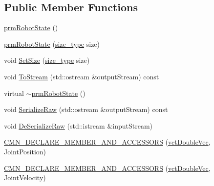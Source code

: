\subsection*{Public Member Functions}
\begin{DoxyCompactItemize}
\item 
\hyperlink{classprm_robot_state_a4c688de0cb879c541ac8a8aab59715fe}{prm\-Robot\-State} ()
\item 
\hyperlink{classprm_robot_state_a08475253ccadaab8c01f04fd113e20a7}{prm\-Robot\-State} (\hyperlink{classprm_robot_state_a2cf2c739d5b3cdd3f9d44e2878183d90}{size\-\_\-type} size)
\item 
void \hyperlink{classprm_robot_state_a2d4ea78a7658becc5e57988eaf4cacd2}{Set\-Size} (\hyperlink{classprm_robot_state_a2cf2c739d5b3cdd3f9d44e2878183d90}{size\-\_\-type} size)
\item 
void \hyperlink{classprm_robot_state_a52834514857c906ed8f11a71f7e11123}{To\-Stream} (std\-::ostream \&output\-Stream) const 
\item 
virtual \hyperlink{classprm_robot_state_aa14bb8c0d12806e4db28408ea0f89e1a}{$\sim$prm\-Robot\-State} ()
\item 
void \hyperlink{classprm_robot_state_a19f7827d565843680215b6e544b183dd}{Serialize\-Raw} (std\-::ostream \&output\-Stream) const 
\item 
void \hyperlink{classprm_robot_state_a86ed0b0af1d86c53bfa3dc32b770d03d}{De\-Serialize\-Raw} (std\-::istream \&input\-Stream)
\end{DoxyCompactItemize}
{\bf }\par
\begin{DoxyCompactItemize}
\item 
\hyperlink{classprm_robot_state_aa03ddcc1beb0e0f41210e8e3fa4483cf}{C\-M\-N\-\_\-\-D\-E\-C\-L\-A\-R\-E\-\_\-\-M\-E\-M\-B\-E\-R\-\_\-\-A\-N\-D\-\_\-\-A\-C\-C\-E\-S\-S\-O\-R\-S} (\hyperlink{vct_dynamic_vector_types_8h_ade4b3068c86fb88f41af2e5187e491c2}{vct\-Double\-Vec}, Joint\-Position)
\end{DoxyCompactItemize}

{\bf }\par
\begin{DoxyCompactItemize}
\item 
\hyperlink{classprm_robot_state_a30b03328a0d3b60ef0c5d2624e2fae31}{C\-M\-N\-\_\-\-D\-E\-C\-L\-A\-R\-E\-\_\-\-M\-E\-M\-B\-E\-R\-\_\-\-A\-N\-D\-\_\-\-A\-C\-C\-E\-S\-S\-O\-R\-S} (\hyperlink{vct_dynamic_vector_types_8h_ade4b3068c86fb88f41af2e5187e491c2}{vct\-Double\-Vec}, Joint\-Velocity)
\end{DoxyCompactItemize}

